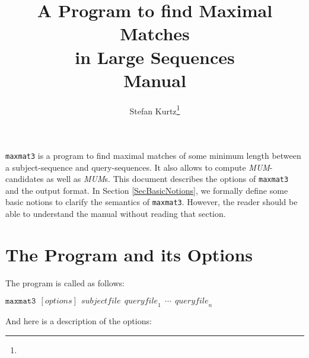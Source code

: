 \documentclass[12pt]{article}
\author{Stefan Kurtz\thanks{\SKaffiliation}}
\title{\textbf{A Program to find Maximal Matches}\\
       \textbf{in Large Sequences}\\[2mm]
       \textbf{Manual}}
\newcommand{\MMthree}{\texttt{maxmat3}\xspace}
\newcommand{\MUM}[0]{\textit{MUM}\xspace}
\begin{document}
\maketitle

\MMthree is a program to find maximal matches of some minimum length 
between a subject-sequence and query-sequences.  It also allows to
compute \MUM-candidates as well as \MUM{s}. This document describes 
the options of \MMthree and the output format. In Section 
\ref{SecBasicNotions}, we formally define some basic notions to clarify
the semantics of \MMthree. However, the reader should be able to understand 
the manual without reading that section.

\section{The Program and its Options}

The program is called as follows:

$\MMthree~~[\mathit{options}]~~\mathit{subjectfile}~~
           \mathit{queryfile}_{1}~~\cdots~~\mathit{queryfile}_{n}$

And here is a description of the options:
\end{document}
